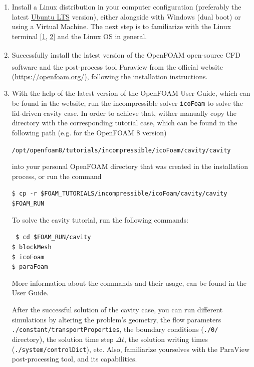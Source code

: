 \documentclass{article}
\newcommand\tab[1][0.5cm]{\hspace*{#1}}
\begin{document}
\begin{enumerate}
	\item Install a Linux distribution in your computer configuration (preferably the latest \href{https://ubuntu.com/}{Ubuntu LTS} version), either alongside with Windows (dual boot) or using a Virtual Machine. The next step is to familiarize with the Linux terminal [\href{https://ubuntu.com/tutorials/command-line-for-beginners#6-a-bit-of-plumbing}{1}, \href{https://www.howtogeek.com/140679/beginner-geek-how-to-start-using-the-linux-terminal/}{2}] and the Linux OS in general.
	
	\item Successfully install the latest version of the OpenFOAM \textsuperscript{\textcopyright} open-source CFD software and the post-process tool Paraview \textsuperscript{\textcopyright} from the official website (\href{https://openfoam.org/}{https://openfoam.org/}), following the installation instructions.
	
	\item With the help of the latest version of the OpenFOAM User Guide, which can be found in the website, run the incompressible solver {\tt icoFoam} to solve the lid-driven cavity case. In order to achieve that, wither manually copy the directory with the corresponding tutorial case, which can be found in the following path (e.g. for the OpenFOAM 8 version)
	
	{\tt \tab /opt/openfoam8/tutorials/incompressible/icoFoam/cavity/cavity }
	
	into your personal OpenFOAM directory that was created in the installation process, or run the command
	
	{\tt \tab \$ cp -r \$FOAM\_TUTORIALS/incompressible/icoFoam/cavity/cavity \$FOAM\_RUN}
	
	\vspace{0.2cm}
	To solve the cavity tutorial, run the following commands:

	{\tt %
	\tab \$ cd \$FOAM\_RUN/cavity	\\%
	\tab \$ blockMesh \\%
	\tab \$ icoFoam \\%
	\tab \$ paraFoam
 	}
 
 	More information about the commands and their usage, can be found in the User Guide.
 	
 	After the successful solution of the cavity case, you can run different simulations by altering the problem's geometry, the flow parameters {\tt ./constant/transportProperties}, the boundary conditions ({\tt ./0/} directory), the solution time step $\Delta t$, the solution writing times ({\tt ./system/controlDict}), etc. Also, familiarize yourselves with the ParaView post-processing tool, and its capabilities. 
 

\end{enumerate}
\end{document}
